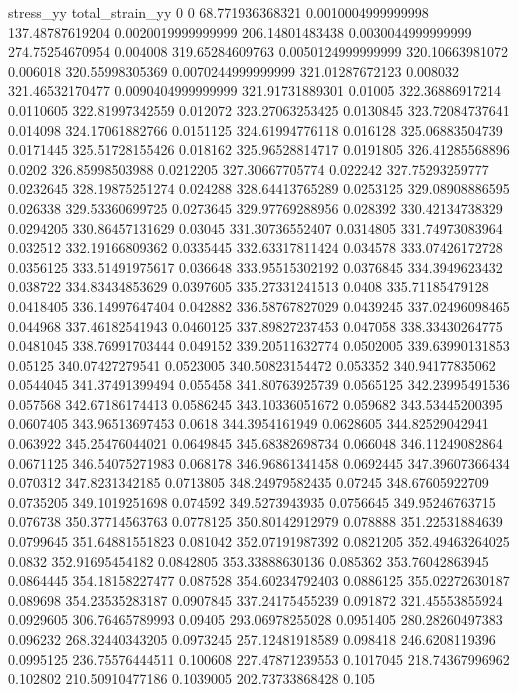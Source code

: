 stress_yy total_strain_yy
0 0
68.771936368321 0.0010004999999998
137.48787619204 0.0020019999999999
206.14801483438 0.0030044999999999
274.75254670954 0.004008
319.65284609763 0.0050124999999999
320.10663981072 0.006018
320.55998305369 0.0070244999999999
321.01287672123 0.008032
321.46532170477 0.0090404999999999
321.91731889301 0.01005
322.36886917214 0.0110605
322.81997342559 0.012072
323.27063253425 0.0130845
323.72084737641 0.014098
324.17061882766 0.0151125
324.61994776118 0.016128
325.06883504739 0.0171445
325.51728155426 0.018162
325.96528814717 0.0191805
326.41285568896 0.0202
326.85998503988 0.0212205
327.30667705774 0.022242
327.75293259777 0.0232645
328.19875251274 0.024288
328.64413765289 0.0253125
329.08908886595 0.026338
329.53360699725 0.0273645
329.97769288956 0.028392
330.42134738329 0.0294205
330.86457131629 0.03045
331.30736552407 0.0314805
331.74973083964 0.032512
332.19166809362 0.0335445
332.63317811424 0.034578
333.07426172728 0.0356125
333.51491975617 0.036648
333.95515302192 0.0376845
334.3949623432 0.038722
334.83434853629 0.0397605
335.27331241513 0.0408
335.71185479128 0.0418405
336.14997647404 0.042882
336.58767827029 0.0439245
337.02496098465 0.044968
337.46182541943 0.0460125
337.89827237453 0.047058
338.33430264775 0.0481045
338.76991703444 0.049152
339.20511632774 0.0502005
339.63990131853 0.05125
340.07427279541 0.0523005
340.50823154472 0.053352
340.94177835062 0.0544045
341.37491399494 0.055458
341.80763925739 0.0565125
342.23995491536 0.057568
342.67186174413 0.0586245
343.10336051672 0.059682
343.53445200395 0.0607405
343.96513697453 0.0618
344.3954161949 0.0628605
344.82529042941 0.063922
345.25476044021 0.0649845
345.68382698734 0.066048
346.11249082864 0.0671125
346.54075271983 0.068178
346.96861341458 0.0692445
347.39607366434 0.070312
347.8231342185 0.0713805
348.24979582435 0.07245
348.67605922709 0.0735205
349.1019251698 0.074592
349.5273943935 0.0756645
349.95246763715 0.076738
350.37714563763 0.0778125
350.80142912979 0.078888
351.22531884639 0.0799645
351.64881551823 0.081042
352.07191987392 0.0821205
352.49463264025 0.0832
352.91695454182 0.0842805
353.33888630136 0.085362
353.76042863945 0.0864445
354.18158227477 0.087528
354.60234792403 0.0886125
355.02272630187 0.089698
354.23535283187 0.0907845
337.24175455239 0.091872
321.45553855924 0.0929605
306.76465789993 0.09405
293.06978255028 0.0951405
280.28260497383 0.096232
268.32440343205 0.0973245
257.12481918589 0.098418
246.6208119396 0.0995125
236.75576444511 0.100608
227.47871239553 0.1017045
218.74367996962 0.102802
210.50910477186 0.1039005
202.73733868428 0.105
